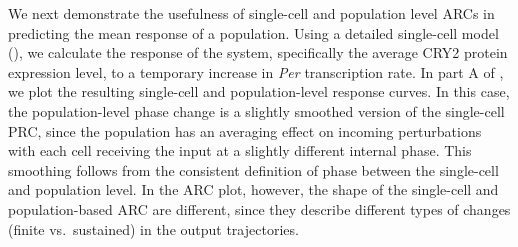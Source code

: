 We next demonstrate the usefulness of single-cell and population level ARCs in predicting the mean response of a population.
Using a detailed single-cell model (), we calculate the response of the system, specifically the average CRY2 protein expression level, to a temporary increase in {\itshape Per} transcription rate.
In part A of , we plot the resulting single-cell and population-level response curves.
In this case, the population-level phase change is a slightly smoothed version of the single-cell PRC, since the population has an averaging effect on incoming perturbations with each cell receiving the input at a slightly different internal phase.
This smoothing follows from the consistent definition of phase between the single-cell and population level.
In the ARC plot, however, the shape of the single-cell and population-based ARC are different, since they describe different types of changes (finite vs.\ sustained) in the output trajectories.

